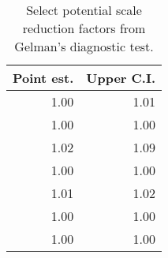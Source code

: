 \begin{table}[ht]
\centering
\begin{tabular}{rr}
  \hline
Point est. & Upper C.I. \\ 
  \hline
1.00 & 1.01 \\ 
  1.00 & 1.00 \\ 
  1.02 & 1.09 \\ 
  1.00 & 1.00 \\ 
  1.01 & 1.02 \\ 
  1.00 & 1.00 \\ 
  1.00 & 1.00 \\ 
   \hline
\end{tabular}
\caption{Select potential scale reduction factors from Gelman's diagnostic test.} 
\label{tab:gelman}
\end{table}
